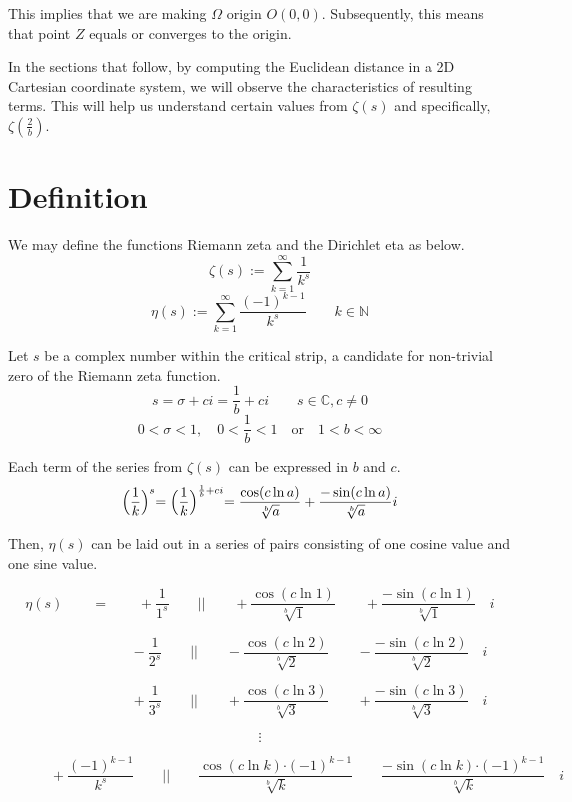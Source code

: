 \documentclass{amsart}
\begin{document}
	This implies that we are making $\Omega$ origin $O(0,0)$. Subsequently, this means that point $Z$ equals or converges to the origin.
	
	In the sections that follow, by computing the Euclidean distance in a 2D Cartesian coordinate system, we will observe the characteristics of resulting terms. This will help us understand certain values from $\zeta(s)$ and specifically, $\zeta(\frac{2}{b})$.
	\[\]
	
	\section{Definition}
	
	We may define the functions Riemann zeta and the Dirichlet eta as below.
	\[ \zeta(s) := \sum\limits_{k=1}^{\infty}\frac{1}{k^s}\]
	\[ \eta(s) := \sum\limits_{k=1}^{\infty}\frac{(-1)^{k-1}}{k^s} \qquad k \in \mathbb{N} \]
	
	Let $s$ be a complex number within the critical strip, a candidate for non-trivial zero of the Riemann zeta function.
	\[ s = \sigma + ci = \frac{1}{b} + ci \qquad s \in \mathbb{C}, c \neq 0 \]
	\[ 0 < \sigma < 1, \quad 0 < \frac{1}{b} < 1 \quad \text{or} \quad 1<b<\infty \]

	Each term of the series from $\zeta(s)$ can be expressed in $b$ and $c$.
	\[ \Bigl( \frac{1}{k} \Bigl)^s = \Bigl( \frac{1}{k} \Bigl)^{\frac{1}{b} + ci} = \frac{\cos({c\ln a})}{\sqrt[b]{a}} + \frac{-\sin({c\ln a})}{\sqrt[b]{a}} i \]
	
	Then, $\eta(s)$ can be laid out in a series of pairs consisting of one cosine value and one sine value. 
		
	\[ \eta(s) \qquad = \qquad +\frac{1}{1^s} \qquad \Big|\Big|  \qquad +\frac{\cos({c\ln 1})}{\sqrt[b]{1}} \qquad +\frac{-\sin({c\ln 1})}{\sqrt[b]{1}} \quad i  \]
	
	\[ \quad \qquad  \qquad \qquad -\frac{1}{2^s} \qquad \Big|\Big|  \qquad -\frac{\cos({c\ln 2})}{\sqrt[b]{2}} \qquad -\frac{-\sin({c\ln 2})}{\sqrt[b]{2}} \quad i  \]
	
	\[ \quad \qquad  \qquad \qquad +\frac{1}{3^s} \qquad \Big|\Big|  \qquad +\frac{\cos({c\ln 3})}{\sqrt[b]{3}} \qquad +\frac{-\sin({c\ln 3})}{\sqrt[b]{3}} \quad i  \]
	
	\[ \vdots \]
	
	\[ \qquad  \quad +\frac{(-1)^{k-1}}{k^s} \qquad \Big|\Big|  \qquad \frac{\cos({c\ln k}){\cdot(-1)^{k-1}}}{\sqrt[b]{k}} \qquad \frac{{-}\sin({c\ln k}){\cdot({-}1)^{k-1}}}{\sqrt[b]{k}} \quad i  \]
	
\end{document}
